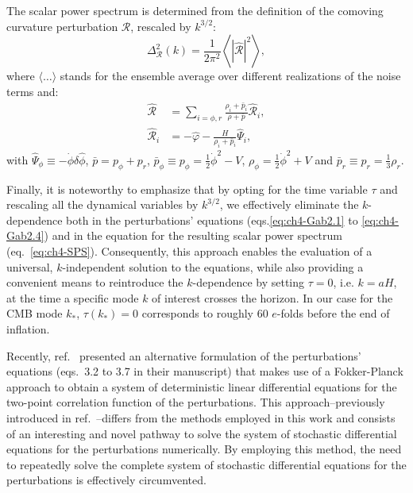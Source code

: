 The scalar power spectrum is determined from the definition of the comoving curvature perturbation $\mathcal{R}$, rescaled by $k^{3/2}$:
\begin{equation}
    \Delta^2_{\mathcal{R}}(k)=\frac{1}{2 \pi^2}\left\langle|\hat{\mathcal{R}}|^2\right\rangle, \label{eq:ch4-SPS}
\end{equation}
where $\langle \dots \rangle$ stands for the ensemble average over different realizations of the noise terms and:
\begin{align}
    \hat{\mathcal{R}}&=\sum_{i=\phi, r} \frac{\rho_i+\bar{p}_i}{\rho+\bar{p}} \hat{\mathcal{R}}_i, \\
    \hat{\mathcal{R}}_i&=-\hat{\varphi}-\frac{H}{\rho_i+\bar{p}_i} \hat{\Psi}_i,
\end{align}
with $\hat{\Psi}_\phi\equiv -\dot{\phi}\delta \hat{\phi}$, $\bar{p}=p_\phi+p_r$, $\bar{p}_\phi \equiv p_\phi=\frac{1}{2}\dot{\phi}^2-V$, $\rho_\phi=\frac{1}{2}\dot{\phi}^2+V$ and $\bar{p}_r\equiv p_r=\frac{1}{3}\rho_r$. 

Finally, it is noteworthy to emphasize that by opting for the time variable $\tau$ and rescaling all the dynamical variables by $k^{3/2}$, we effectively eliminate the $k$-dependence both in the perturbations’ equations (eqs.\ref{eq:ch4-Gab2.1} to \ref{eq:ch4-Gab2.4}) and in the equation for the resulting scalar power spectrum (eq.~\eqref{eq:ch4-SPS}). Consequently, this approach enables the evaluation of a universal, $k$-independent solution to the equations, while also providing a convenient means to reintroduce the $k$-dependence by setting $\tau = 0$, i.e. $k=aH$, at the time a specific mode $k$ of interest crosses the horizon. In our case for the CMB mode $k_{*}$, $\tau(k_*)=0$ corresponds to roughly 60 $e$-folds before the end of inflation.

Recently, ref.~\cite{Ballesteros:2023dno} presented an alternative formulation of the perturbations' equations (eqs.~3.2 to 3.7 in their manuscript) that  makes use of a Fokker-Planck approach to obtain a system of deterministic linear
differential equations for the two-point correlation function of the perturbations. This approach--previously introduced in ref.~\cite{Ballesteros:2022hjk}--differs from the methods employed in this work and consists of an interesting and novel pathway to solve the system of stochastic differential equations for the perturbations numerically. By employing this method, the need to repeatedly solve the complete system of stochastic differential equations for the perturbations is effectively circumvented.

